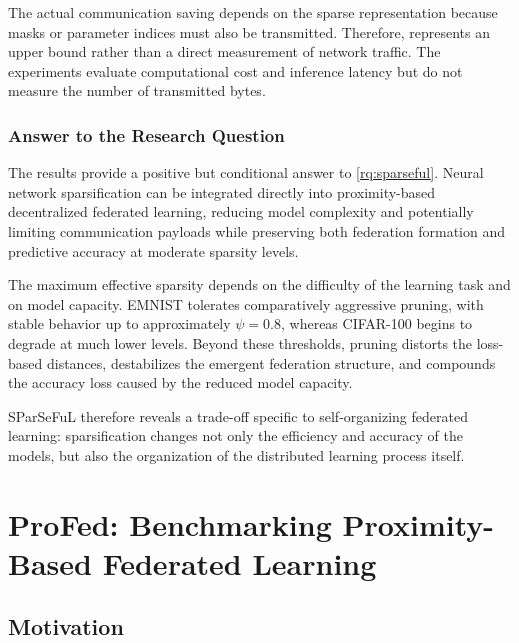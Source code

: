 The actual communication saving depends on the sparse representation because
 masks or parameter indices must also be transmitted.
%
Therefore, 
  represents an upper
 bound rather than a direct measurement of network traffic.
%
The experiments evaluate computational cost 
 and inference latency but do not measure the number of transmitted bytes.

\subsubsection{Answer to the Research Question}

The results provide a positive but conditional answer to \ref{rq:sparseful}.
%
Neural network sparsification can be integrated directly into proximity-based decentralized federated learning, 
 reducing model complexity and potentially limiting communication payloads 
 while preserving both federation formation and predictive accuracy at moderate sparsity levels.

The maximum effective sparsity depends on the difficulty of the learning task
 and on model capacity.
%
EMNIST tolerates comparatively aggressive pruning, 
 with stable behavior up to approximately \(\psi=0.8\), 
 whereas CIFAR-100 begins to degrade at much lower levels.
%
Beyond these thresholds, 
 pruning distorts the loss-based distances, destabilizes the emergent federation structure, 
 and compounds the accuracy loss caused by the reduced model capacity.

SParSeFuL therefore reveals a trade-off specific to self-organizing federated learning: 
 sparsification changes not only the efficiency and accuracy of the models, 
 but also the organization of the distributed learning process itself.

\section{ProFed: Benchmarking Proximity-Based Federated Learning}
\label{sec:selforgfl-benchmarking}

\subsection{Motivation}

